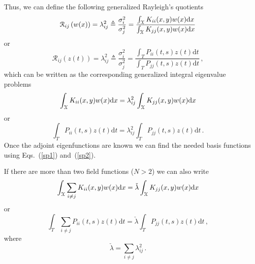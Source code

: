 \documentclass[10pt]{article}
\newcommand{\eqstwo}[2]{Eqs.\ (\ref{#1}) and~(\ref{#2})}
\begin{document}
Thus, we can define the following generalized Rayleigh's quotients
\begin{equation}
    \mathcal{R}_{ij}\left(w(x)\right)=\lambda_{ij}^2\triangleq\frac{\sigma_{i}^2}{\sigma_{j}^2} = 
 \frac{\int_{\cal X} K_{ii}(x,y) w(x) \mathrm{d} x}{ \int_{\cal X} K_{jj}(x,y) w(x) \mathrm{d} x} 
 \end{equation}
or
\begin{equation}
        \mathcal{R}_{ij}\left(z(t)\right)=\lambda_{ij}^2\triangleq\frac{\sigma_{i}^2}{\sigma_{j}^2} =\frac{\int_T P_{ii}(t,s) z(t) \mathrm{d} t}{ \int_T P_{jj}(t,s) z(t) \mathrm{d} t}\,,
\end{equation}
which can be written as the corresponding generalized integral eigenvalue problems
\begin{equation}
    \int_{\cal X} K_{ii}(x,y) w(x) \mathrm{d} x = \lambda_{ij}^2  \int_{\cal X} K_{jj}(x,y) w(x) \mathrm{d} x
 \end{equation}
or
\begin{equation}
        \int_T P_{ii}(t,s) z(t) \mathrm{d} t=\lambda_{ij}^2 \int_T P_{jj}(t,s) z(t) \mathrm{d} t\,.
\end{equation}
Once the adjoint eigenfunctions are known we can find the needed basis functions using \eqstwo{sp1}{sp2}.

If there are more than two field functions ($N>2$) we can also write
\begin{equation}
    \int_{\cal X} \sum_{i\ne j} K_{ii}(x,y) w(x) \mathrm{d} x = \check\lambda  \int_{\cal X} K_{jj}(x,y) w(x) \mathrm{d} x
 \end{equation}
or
\begin{equation}
        \int_T \sum_{i\ne j} P_{ii}(t,s) z(t) \mathrm{d} t=\check\lambda \int_T P_{jj}(t,s) z(t) \mathrm{d} t\,,
\end{equation}
where
\begin{equation}
    \check\lambda =  \sum_{i\ne j} \lambda_{ij}^2\,.
\end{equation}
\end{document}
